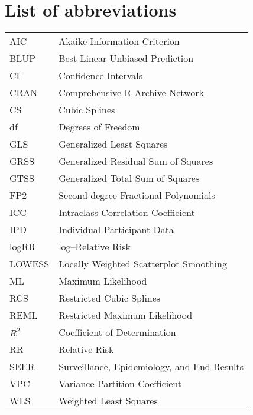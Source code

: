 %

\chapter*{List of abbreviations}
\begin{tabular}{ll}

AIC & Akaike Information Criterion \\
BLUP & Best Linear Unbiased Prediction \\
CI & Confidence Intervals \\
CRAN & Comprehensive R Archive Network \\
CS & Cubic Splines \\
df & Degrees of Freedom \\
GLS & Generalized Least Squares \\
GRSS & Generalized Residual Sum of Squares \\
GTSS & Generalized Total Sum of Squares \\
FP2 & Second-degree Fractional Polynomials \\
ICC & Intraclass Correlation Coefficient \\
IPD & Individual Participant Data \\
logRR & log--Relative Risk \\
LOWESS & Locally Weighted Scatterplot Smoothing \\
ML & Maximum Likelihood \\
RCS & Restricted Cubic Splines \\
REML & Restricted Maximum Likelihood \\
$R^2$ & Coefficient of Determination \\
RR & Relative Risk \\
SEER & Surveillance, Epidemiology, and End Results \\
VPC & Variance Partition Coefficient \\
WLS & Weighted Least Squares


\end{tabular}